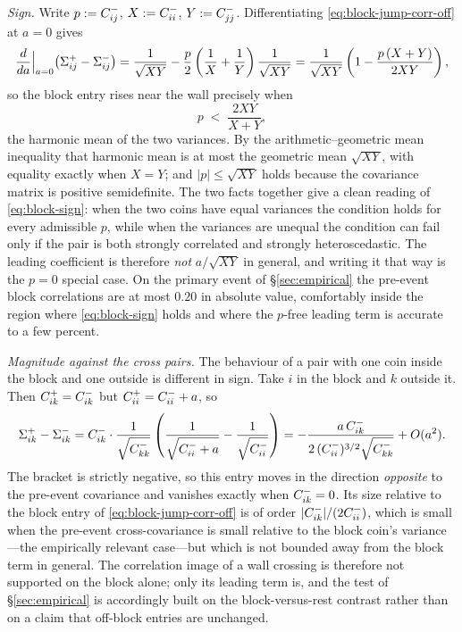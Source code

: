 \begin{remark}
\emph{Sign.} Write $p:=C^-_{ij}$, $X:=C^-_{ii}$, $Y:=C^-_{jj}$. Differentiating \eqref{eq:block-jump-corr-off} at $a=0$ gives
\[
\frac{d}{da}\Big|_{a=0}\bigl(\Sigma^+_{ij}-\Sigma^-_{ij}\bigr)
= \frac{1}{\sqrt{XY}} - \frac{p}{2}\left(\frac{1}{X}+\frac{1}{Y}\right)\frac{1}{\sqrt{XY}}
= \frac{1}{\sqrt{XY}}\left(1 - \frac{p\,(X+Y)}{2XY}\right),
\]
so the block entry rises near the wall precisely when
\begin{equation}\label{eq:block-sign}
p \;<\; \frac{2XY}{X+Y},
\end{equation}
the harmonic mean of the two variances. By the arithmetic--geometric mean inequality that harmonic mean is at most the geometric mean $\sqrt{XY}$, with equality exactly when $X=Y$; and $|p|\le\sqrt{XY}$ holds because the covariance matrix is positive semidefinite. The two facts together give a clean reading of \eqref{eq:block-sign}: when the two coins have equal variances the condition holds for every admissible $p$, while when the variances are unequal the condition can fail only if the pair is both strongly correlated and strongly heteroscedastic. The leading coefficient is therefore \emph{not} $a/\sqrt{XY}$ in general, and writing it that way is the $p=0$ special case. On the primary event of \S\ref{sec:empirical} the pre-event block correlations are at most $0.20$ in absolute value, comfortably inside the region where \eqref{eq:block-sign} holds and where the $p$-free leading term is accurate to a few percent.

\emph{Magnitude against the cross pairs.} The behaviour of a pair with one coin inside the block and one outside is different in sign. Take $i$ in the block and $k$ outside it. Then $C^+_{ik} = C^-_{ik}$ but $C^+_{ii} = C^-_{ii}+a$, so
\begin{equation}\label{eq:cross-jump-corr}
\Sigma^+_{ik} - \Sigma^-_{ik}
= C^-_{ik}\cdot\frac{1}{\sqrt{C^-_{kk}}}\left(\frac{1}{\sqrt{C^-_{ii}+a}} - \frac{1}{\sqrt{C^-_{ii}}}\right)
= -\frac{a\,C^-_{ik}}{2\,(C^-_{ii})^{3/2}\sqrt{C^-_{kk}}} + O(a^2).
\end{equation}
The bracket is strictly negative, so this entry moves in the direction \emph{opposite} to the pre-event covariance and vanishes exactly when $C^-_{ik}=0$. Its size relative to the block entry of \eqref{eq:block-jump-corr-off} is of order $|C^-_{ik}|/(2C^-_{ii})$, which is small when the pre-event cross-covariance is small relative to the block coin's variance---the empirically relevant case---but which is not bounded away from the block term in general. The correlation image of a wall crossing is therefore not supported on the block alone; only its leading term is, and the test of \S\ref{sec:empirical} is accordingly built on the block-versus-rest contrast rather than on a claim that off-block entries are unchanged.
\end{remark}

